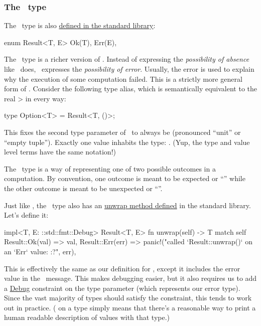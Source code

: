\subsubsection*{The \result\ type}

The \result\ type is also \href{https://doc.rust-lang.org/std/result/}{defined in the standard library}:

\begin{rustc}
enum Result<T, E> {
    Ok(T),
    Err(E),
}
\end{rustc}

The \result\ type is a richer version of \option. Instead of expressing the \emph{possibility of absence} like 
\option\ does, \result\ expresses the \emph{possibility of error}. Usually, the error is used to explain why the 
execution of some computation failed. This is a strictly more general form of \option. Consider the following type 
alias, which is semantically equivalent to the real > in every way:

\begin{rustc}
type Option<T> = Result<T, ()>;
\end{rustc}

This fixes the second type parameter of \result\ to always be \code{()} (pronounced \enquote{unit} or \enquote{empty 
tuple}). Exactly one value inhabits the \code{()} type: \code{()}. (Yup, the type and value level terms have the same notation!)

\blank

The \result\ type is a way of representing one of two possible outcomes in a computation. By convention, one outcome is 
meant to be expected or \enquote{} while the other outcome is meant to be unexpected or \enquote{}.

\blank

Just like \option, the \result\ type also has an 
\href{https://doc.rust-lang.org/std/result/enum.Result.html\#method.unwrap}{unwrap method defined} in the standard library. 
Let's define it:

\begin{rustc}
impl<T, E: ::std::fmt::Debug> Result<T, E> {
    fn unwrap(self) -> T {
        match self {
            Result::Ok(val) => val,
            Result::Err(err) =>
              panic!("called `Result::unwrap()` on an `Err` value: {:?}", err),
        }
    }
}
\end{rustc}

This is effectively the same as our definition for , except it includes the error value in the \panic\ 
message. This makes debugging easier, but it also requires us to add a 
\href{https://doc.rust-lang.org/std/fmt/trait.Debug.html}{Debug} constraint on the  type parameter (which represents 
our error type). Since the vast majority of types should satisfy the  constraint, this tends to work out in 
practice. (\code{Debug} on a type simply means that there's a reasonable way to print a human readable description of values 
with that type.)

